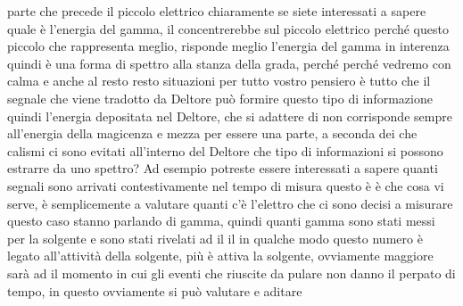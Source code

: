 parte che precede il piccolo elettrico chiaramente se siete interessati a sapere quale è l'energia del gamma, il concentrerebbe sul piccolo elettrico perché questo piccolo che rappresenta meglio, risponde meglio l'energia del gamma in interenza quindi è una forma di spettro alla stanza della grada, perché perché vedremo con calma e anche al resto resto situazioni per tutto vostro pensiero è tutto che il segnale che viene tradotto da Deltore può formire questo tipo di informazione quindi l'energia depositata nel Deltore, che si adattere di non corrisponde sempre all'energia della magicenza e mezza per essere una parte, a seconda dei che calismi ci sono evitati all'interno del Deltore che tipo di informazioni si possono estrarre da uno spettro? Ad esempio potreste essere interessati a sapere quanti segnali sono arrivati contestivamente nel tempo di misura questo è è che cosa vi serve, è semplicemente a valutare quanti c'è l'elettro che ci sono decisi a misurare questo caso stanno parlando di gamma, quindi quanti gamma sono stati messi per la solgente e sono stati rivelati ad il il in qualche modo questo numero è legato all'attività della solgente, più è attiva la solgente, ovviamente maggiore sarà ad il momento in cui gli eventi che riuscite da pulare non danno il perpato di tempo, in questo ovviamente si può valutare e aditare

